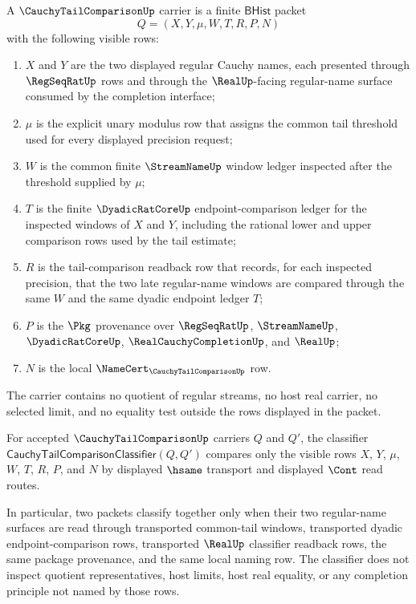 \begin{definition}
\label{def:cauchy-tail-comparison-carrier}
A $\CauchyTailComparisonUp$ carrier is a finite $\mathsf{BHist}$ packet
$$
Q=(X,Y,\mu,W,T,R,P,N)
$$
with the following visible rows:
\begin{enumerate}
\item $X$ and $Y$ are the two displayed regular Cauchy names, each presented through $\RegSeqRatUp$ rows and through the $\RealUp$-facing regular-name surface consumed by the completion interface;
\item $\mu$ is the explicit unary modulus row that assigns the common tail threshold used for every displayed precision request;
\item $W$ is the common finite $\StreamNameUp$ window ledger inspected after the threshold supplied by $\mu$;
\item $T$ is the finite $\DyadicRatCoreUp$ endpoint-comparison ledger for the inspected windows of $X$ and $Y$, including the rational lower and upper comparison rows used by the tail estimate;
\item $R$ is the tail-comparison readback row that records, for each inspected precision, that the two late regular-name windows are compared through the same $W$ and the same dyadic endpoint ledger $T$;
\item $P$ is the $\Pkg$ provenance over $\RegSeqRatUp$, $\StreamNameUp$, $\DyadicRatCoreUp$, $\RealCauchyCompletionUp$, and $\RealUp$;
\item $N$ is the local $\NameCert_{\CauchyTailComparisonUp}$ row.
\end{enumerate}
The carrier contains no quotient of regular streams, no host real carrier, no selected limit, and no equality test outside the rows displayed in the packet.
\end{definition}

\begin{definition}
\label{def:cauchy-tail-comparison-classifier}
For accepted $\CauchyTailComparisonUp$ carriers $Q$ and $Q'$, the classifier $\mathsf{CauchyTailComparisonClassifier}(Q,Q')$ compares only the visible rows $X$, $Y$, $\mu$, $W$, $T$, $R$, $P$, and $N$ by displayed $\hsame$ transport and displayed $\Cont$ read routes.

In particular, two packets classify together only when their two regular-name surfaces are read through transported common-tail windows, transported dyadic endpoint-comparison rows, transported $\RealUp$ classifier readback rows, the same package provenance, and the same local naming row. The classifier does not inspect quotient representatives, host limits, host real equality, or any completion principle not named by those rows.
\end{definition}

